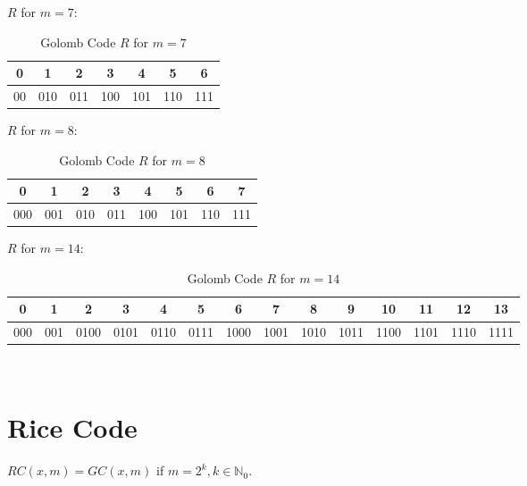 \noindent
$R$ for $m=7$:

\begin{table}
\begin{tabular}{|c||c|c|c|c|c|c|}\hline
    0 & 1 & 2 & 3 & 4 & 5 & 6\\\hline
    00 & 010 & 011 & 100 & 101 & 110 & 111\\\hline
\end{tabular}
\caption{Golomb Code $R$ for $m=7$}
\end{table}

\noindent
$R$ for $m=8$:

\begin{table}
\begin{tabular}{||c|c|c|c|c|c|c|c|}\hline
    0 & 1 & 2 & 3 & 4 & 5 & 6 & 7\\\hline
    000 & 001 & 010 & 011 & 100 & 101 & 110 & 111\\\hline
\end{tabular}
\caption{Golomb Code $R$ for $m=8$}
\end{table}

\noindent
$R$ for $m=14$:

\begin{table*}
\begin{tabular}{|c|c||c|c|c|c|c|c|c|c|c|c|c|c|}\hline
    0 & 1 & 2 & 3 & 4 & 5 & 6 & 7 & 8 & 9 & 10 & 11 & 12 & 13\\\hline
    000 & 001 & 0100 & 0101 & 0110 & 0111 & 1000 & 1001 & 1010 & 1011 & 1100 & 1101 & 1110 & 1111\\\hline
\end{tabular}
\\
\caption{Golomb Code $R$ for $m=14$}
\end{table*}

\section{Rice Code}
$RC(x,m) = GC(x,m)$ if $m = 2^k, k \in \mathbb{N}_0$. 




